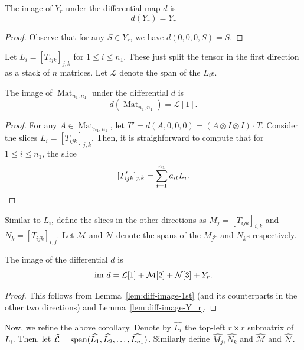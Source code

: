 \documentclass[11pt]{article}
\theoremstyle{definition}
\theoremstyle{remark}
\newcommand{\spa}{{\rm span}}
\newcommand{\Mat}{\operatorname{Mat}}
\newcommand{\im}{{\rm im}}
\begin{document}
\begin{lemma} \label{lem:diff-image-Y_r}
The image of $Y_r$ under the differential map $d$ is 
$$
d(Y_r) = Y_r
$$
\end{lemma}
\begin{proof}
Observe that for any $S \in Y_r$, we have $d(0,0,0,S) = S$. 
\end{proof}

Let $L_i = [T_{ijk}]_{j,k} $ for $1 \leq i \leq n_1$. These just split the tensor in the first direction as a stack of $n$ matrices. Let $\mathcal{L}$ denote the span of the $L_i$s.

\begin{lemma} \label{lem:diff-image-1st}
The image of $\Mat_{n_1,n_1}$ under the differential $d$ is
\begin{equation} \label{eq:image-differential-linear}
d(\Mat_{n_1,n_1}) = \mathcal{L}[1].
\end{equation}
\end{lemma}


\begin{proof}
For any $A \in \Mat_{n_1,n_1}$, let $T' = d(A,0,0,0) = (A \otimes I \otimes I) \cdot T$. Consider the slices $L_i = [T_{ijk}]_{j,k} $. Then, it is straighforward to compute that for $1 \leq i \leq n_1$, the slice
\[
[T'_{ijk}]_{j,k}= \sum_{t = 1}^{n_1} a_{it} L_i.\qedhere
\]
\end{proof}

Similar to $L_i$, define the slices in the other directions as $M_j = [T_{ijk}]_{i,k}$ and $N_k = [T_{ijk}]_{i,j}$. Let $\mathcal{M}$ and $\mathcal{N}$ denote the spans of the $M_j$s and $N_k$s respectively.

\begin{corollary} \label{cor:image-d}
The image of the differential $d$ is
$$
\im\ d = \mathcal{L}[1] + \mathcal{M}[2] + \mathcal{N}[3] + Y_r.
$$
\end{corollary}

\begin{proof}
This follows from %
Lemma~\ref{lem:diff-image-1st} (and its counterparts in the other two directions) and Lemma~\ref{lem:diff-image-Y_r}.
\end{proof}

Now, we refine the above corollary. Denote by $\widehat{L_i}$ the top-left $ r \times r$ submatrix of $L_i$. Then, let $\mathcal{\widehat{L}} = \spa (\widehat{L_1}, \widehat{L_2} ,\dots, \widehat{L_{n_1}})$. Similarly define $\widehat{M_j}, \widehat{N_k}$ and $\mathcal{\widehat{M}}$ and $\mathcal{\widehat{N}}$.
\end{document}
